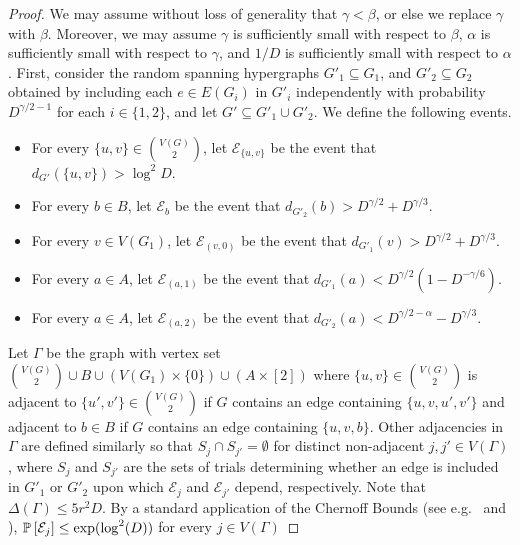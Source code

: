 \documentclass[11pt]{article}
\numberwithin{equation}{section}
\newcounter{i}
\theoremstyle{plain}
\theoremstyle{plain} %
\theoremstyle{definition}
\newcommand{\cE}{\mathcal{E}}
\newcommand{\Prob}[1]{\ensuremath{%
\mathbb P\left[#1\right]
}}
\newcommand{\Expect}[1]{\ensuremath{%
\mathbb E\left[#1\right]
}}
\def\COMMENT#1{}
\begin{document}
\begin{proof}
  We may assume without loss of generality that $\gamma < \beta$, or else we replace $\gamma$ with $\beta$.  Moreover, we may assume $\gamma$ is sufficiently small with respect to $\beta$, $\alpha$ is sufficiently small with respect to $\gamma$, and $1 / D$ is sufficiently small with respect to $\alpha$.  First, consider the random spanning hypergraphs $G'_1 \subseteq G_1$, and $G'_2 \subseteq G_2$ obtained by including each $e \in E(G_i)$ in $G'_i$ independently with probability $D^{\gamma/2 - 1}$ for each $i \in \{1,2\}$, and let $G' \subseteq G'_1 \cup G'_2$.
  We define the following events.
  \begin{itemize}
  \item For every $\{u,v\} \in \binom{V(G)}{2}$, let $\cE_{\{u,v\}}$ be the event that $d_{G'}(\{u,v\}) > \log^2 D$.
  \item For every $b \in B$, let $\cE_b$ be the event that $d_{G'_2}(b) > D^{\gamma/2} + D^{\gamma/3}$.
  \item For every $v \in V(G_1)$, let $\cE_{(v, 0)}$ be the event that $d_{G'_1}(v) > D^{\gamma/2} + D^{\gamma/3}$.
  \item For every $a \in A$, let $\cE_{(a,1)}$ be the event that $d_{G'_1}(a) < D^{\gamma/2}(1 - D^{-\gamma / 6})$.
  \item For every $a \in A$, let $\cE_{(a,2)}$ be the event that $d_{G'_2}(a) < D^{\gamma/2 - \alpha} - D^{\gamma/3}$.
  \end{itemize}
  Let $\Gamma$ be the graph with vertex set $\binom{V(G)}{2} \cup B \cup (V(G_1)\times\{0\}) \cup (A\times[2])$ where $\{u,v\} \in \binom{V(G)}{2}$ is adjacent to $\{u',v'\} \in \binom{V(G)}{2}$ if $G$ contains an edge containing $\{u,v, u', v'\}$ and adjacent to $b \in B$ if $G$ contains an edge containing $\{u,v, b\}$.  Other adjacencies in $\Gamma$ are defined similarly so that $S_j \cap S_{j'} = \emptyset$ for distinct non-adjacent $j,j'\in V(\Gamma)$, where $S_j$ and $S_{j'}$ are the sets of trials determining whether an edge is included in $G'_1$ or $G'_2$ upon which $\cE_j$ and $\cE_{j'}$ depend, respectively.  Note that $\Delta(\Gamma) \leq 5r^2D$.
  By a standard application of the Chernoff Bounds (see e.g.~\cite[Theorem A.1.12]{AS16} and \cite[Corollary 2.3]{JLR00}), $\Prob{\cE_j} \leq \exp(\log^2(D))$ for every $j \in V(\Gamma)$\COMMENT{
  \begin{itemize}
      \item $\Expect{d_{G'}(\{u,v\})}  \leq (D^{1 - \beta})D^{\gamma/2 - 1} = D^{\gamma/2 - \beta}$, so \begin{equation*}

\end{equation*}
\end{itemize}}
\end{proof}
\end{document}
